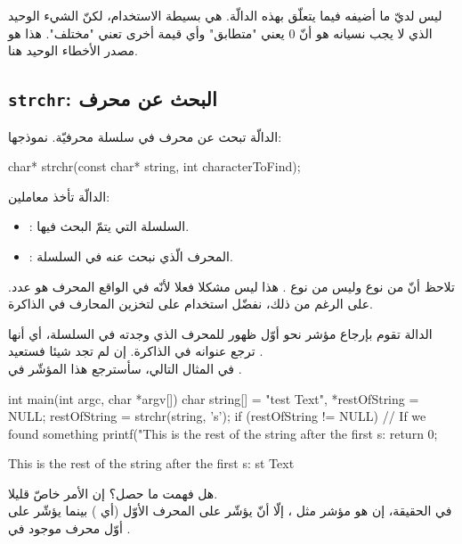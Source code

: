 ليس لديّ ما أضيفه فيما يتعلّق بهذه الدالّة. هي بسيطة الاستخدام، لكنّ الشيء الوحيد الذي لا يجب نسيانه هو أنّ 0 يعني "متطابق" وأي قيمة أخرى تعني "مختلف". هذا هو مصدر الأخطاء الوحيد هنا.

\subsection{\texttt{strchr}: البحث عن محرف}

الدالّة
تبحث عن محرف في سلسلة محرفيّة. نموذجها:

\begin{Csource}
char* strchr(const char* string, int characterToFind);
\end{Csource}

الدالّة تأخذ معاملين:

\begin{itemize}
  \item {}: السلسلة التي يتمّ البحث فيها.
  \item {}: المحرف الّذي نبحث عنه في السلسلة.
\end{itemize}

\begin{information}
  تلاحظ أنّ
  من نوع
  وليس من نوع
  .
  هذا ليس مشكلا فعلا لأنّه في الواقع المحرف هو عدد. على الرغم من ذلك، نفضّل استخدام
  على
  لتخزين المحارف في الذاكرة.
\end{information}

الدالة تقوم بإرجاع مؤشر نحو أوّل ظهور للمحرف الذي وجدته في السلسلة، أي أنها ترجع عنوانه في الذاكرة. إن لم تجد شيئا فستعيد
.\\
في المثال التالي، سأسترجع هذا المؤشّر في
.

\begin{Csource}
int main(int argc, char *argv[])
{
	char string[] = "test  Text", *restOfString = NULL;
	restOfString = strchr(string, 's');
	if (restOfString != NULL) // If we found something
	{
    		printf("This is the rest of the string after the first s:%
	 }
  return 0;
}
\end{Csource}

\begin{Console}
This is the rest of the string after the first s: st  Text
\end{Console}

هل فهمت ما حصل؟ إن الأمر خاصّ قليلا.\\
في الحقيقة، إن
هو مؤشر مثل
،
إلّا أنّ
يؤشّر على المحرف الأوّل
(أي )
بينما
يؤشّر على أوّل محرف
موجود في
.

